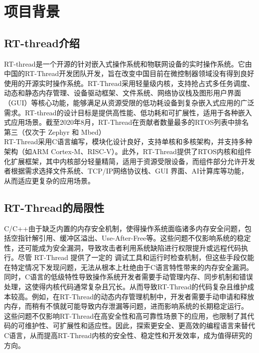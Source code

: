 
\section{项目背景}
\subsection{RT-thread介绍}
\indent RT-thread是一个开源的针对嵌入式操作系统和物联网设备的实时操作系统。它由中国的RT-Thread开发团队开发，旨在改变中国目前在微控制器领域没有得到良好使用的开源实时操作系统。RT-Thread采用轻量级内核，支持抢占式多任务调度、动态和静态内存管理、设备驱动框架、文件系统、网络协议栈及图形用户界面（GUI）等核心功能，能够满足从资源受限的低功耗设备到复杂嵌入式应用的广泛需求。RT-thread的设计目标是提供高性能、低功耗和可扩展性，适用于各种嵌入式应用场景。截至2020年8月，RT-Thread在贡献者数量最多的RTOS列表中排名第三（仅次于 Zephyr 和 Mbed）\\
\indent RT-Thread采用C语言编写，模块化设计良好，支持单核和多核架构，并支持多种架构（如ARM Cortex-M、RISC-V）。此外，RT-Thread提供了RTOS内核和组件化扩展框架，其中内核部分轻量精简，适用于资源受限设备，而组件部分允许开发者根据需求选择文件系统、TCP/IP网络协议栈、GUI 界面、AI计算库等功能，从而适应更复杂的应用场景。\\
\subsection{RT-Thread的局限性}
\indent C/C++由于缺乏内置的内存安全机制，使得操作系统面临诸多内存安全问题，包括空指针解引用、缓冲区溢出、Use-After-Free等。这些问题不仅影响系统的稳定性，还可能成为安全漏洞，导致攻击者利用系统缺陷进行权限提升或远程代码执行。尽管 RT-Thread 提供了一定的 调试工具和运行时检查机制，但这些手段仅能在特定情况下发现问题，无法从根本上杜绝由于C语言特性带来的内存安全漏洞。\\
\indent 同时，C语言的低级特性导致操作系统开发者需要手动管理内存、同步机制和错误处理，这使得内核代码通常复杂且冗长。从而导致RT-Thread的代码复杂且维护成本较高。例如，在RT-Thread的动态内存管理机制中，开发者需要手动申请和释放内存，而稍有不慎就可能导致内存泄漏等问题，进而影响系统的长期稳定运行。\\
\indent 这些问题不仅影响RT-Thread在高安全性和高可靠性场景下的应用，也限制了其代码的可维护性、可扩展性和适应性。因此，探索更安全、更高效的编程语言来替代C语言，从而提高RT-Thread内核的安全性、稳定性和开发效率，成为值得研究的方向。\\
